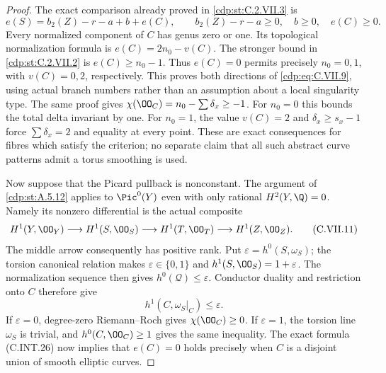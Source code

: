 \begin{proof}
The exact comparison already proved in
\ref{cdp:st:C.2.VII.3} is
\[
 e(S)=b_2(Z)-r-a+b+e(C),
 \qquad b_2(Z)-r-a\ge0,\quad b\ge0,\quad e(C)\ge0.
 \tag{C.VII.10}\label{cdp:eq:C.VII.10}
\]
Every normalized component of $C$ has genus
zero or one. Its topological normalization
formula is $e(C)=2n_0-v(C)$. The stronger
bound in \ref{cdp:st:C.2.VII.2} is $e(C)\ge n_0-1$.
Thus $e(C)=0$ permits precisely $n_0=0,1$,
with $v(C)=0,2$, respectively. This proves
both directions of \eqref{cdp:eq:C.VII.9}, using actual
branch numbers rather than an assumption
about a local singularity type.
The same proof gives
$\chi(\OO_C)=n_0-\sum\delta_x\ge-1$.
For $n_0=0$ this bounds the total delta
invariant by one. For $n_0=1$, the value
$v(C)=2$ and $\delta_x\ge s_x-1$ force
$\sum\delta_x=2$ and equality at every point.
These are exact consequences for fibres which
satisfy the criterion; no separate claim
that all such abstract curve patterns admit
a torus smoothing is used.

Now suppose that the Picard pullback is
nonconstant. The argument of \ref{cdp:st:A.5.12} applies
to $\Pic^0(Y)$ even with only rational
$H^2(Y,\Q)=0$. Namely its nonzero differential
is the actual composite
\[
 H^1(Y,\OO_Y)\longrightarrow H^1(S,\OO_S)
 \longrightarrow H^1(T,\OO_T)
 \longrightarrow H^1(Z,\OO_Z).
 \tag{C.VII.11}\label{cdp:eq:C.VII.11}
\]
The middle arrow consequently has positive
rank. Put $\varepsilon=h^0(S,\omega_S)$;
the torsion canonical relation makes
$\varepsilon\in\{0,1\}$ and
$h^1(S,\OO_S)=1+\varepsilon$.
The normalization sequence then gives
$h^0(\mathcal Q)\le\varepsilon$.
Conductor duality and restriction onto $C$
therefore give
\[
 h^1(C,\omega_S|_C)\le\varepsilon.
 \tag{C.VII.12}\label{cdp:eq:C.VII.12}
\]
If $\varepsilon=0$, degree-zero
Riemann--Roch gives $\chi(\OO_C)\ge0$.
If $\varepsilon=1$, the torsion line
$\omega_S$ is trivial, and
$h^0(C,\OO_C)\ge1$ gives the same inequality.
The exact formula (C.INT.26) now implies
that $e(C)=0$ holds precisely when $C$ is
a disjoint union of smooth elliptic curves.


\end{proof}
